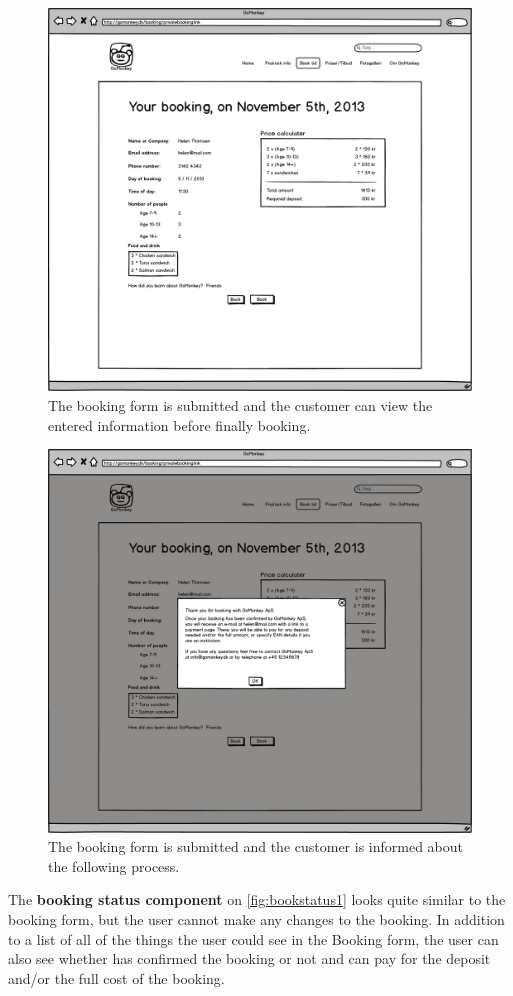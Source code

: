 \begin{figure}[htbp]
    \centering
        \includegraphics[width=.8\textwidth]{figures/mockup/booking_confirmation.png}
	    \caption{The booking form is submitted and the customer can view the entered information before finally booking.}
        \label{fig:bookconfirm}
\end{figure}
\begin{figure}[htbp]
    \centering
        \includegraphics[width=.8\textwidth]{figures/mockup/booking_confirmation_bookpressed.png}
	    \caption{The booking form is submitted and the customer is informed about the following process.}
        \label{fig:bookconfirmpressed}
\end{figure}

The \textbf{booking status component} on \autoref{fig:bookstatus1} looks quite similar 
to the booking form, but the 
user cannot make any changes to the booking. In addition to a list of all of 
the things the user could see in the Booking form, the user can also see 
whether \gomonkey{} has confirmed the booking or not and can pay for the deposit 
and/or the full cost of the booking.

